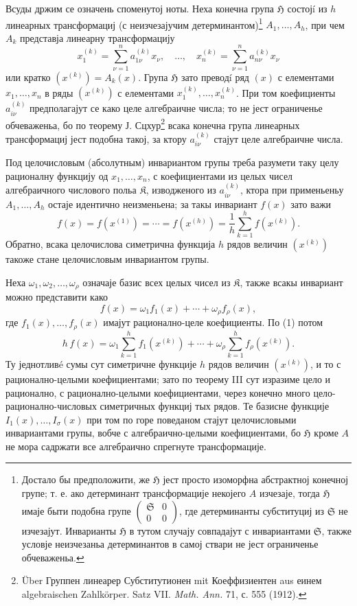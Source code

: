 ﻿\documentclass[11pt]{article}
\providecommand{\frH}{\mathfrak H}
\providecommand{\frK}{\mathfrak K}
\providecommand{\frS}{\mathfrak S}
\begin{document}
Всуды држим се означень споменутој ноты. Неха конечна група \(\frH\) состојí из \(h\) линеарных трансформациј (с неизчезајучим детерминантом)\footnote{Достало бы предположити, же \(\frH\) јест просто изоморфна абстрактној конечној групе; т. е. ако детерминант трансформације некојего \(A\) изчезаје, тогда \(\frH\) имаје быти подобна групе \(\begin{pmatrix}\frS&0\\0&0\end{pmatrix}\), где детерминанты субституциј из \(\frS\) не изчезајут. Инварианты \(\frH\) в тутом случају совпадајут с инвариантами \(\frS\), также условје неизчезаньа детерминантов в самој ствари не јест ограниченье обчеваженьа.} \(A_1,\ldots,A_h\), при чем \(A_k\) представја линеарну трансформацију
\[
        x_1^{(k)}=\sum_{\nu=1}^{n}a_{1\nu}^{(k)}x_\nu,
        \quad\ldots,\quad
        x_n^{(k)}=\sum_{\nu=1}^{n}a_{n\nu}^{(k)}x_\nu
\]
или кратко \((x^{(k)})=A_k(x)\). Група \(\frH\) зато преводí ряд \((x)\) с елементами \(x_1,\ldots,x_n\) в ряды \((x^{(k)})\) с елементами \(x_1^{(k)},\ldots,x_n^{(k)}\). При том коефициенты \(a_{i\nu}^{(k)}\) предполагајут се како целе алгебраичне числа; то не јест ограниченье обчеваженьа, бо по теорему Ј. Сцхур\footnote{Über Группен линеарер Субститутионен mit Коеффизиентен aus еинем algebraischen Zahlkörper. Satz VII. \emph{Math. Ann.} 71, с. 555 (1912).} всака конечна група линеарных трансформациј јест подобна такој, за ктору \(a_{i\nu}^{(k)}\) стајут целе алгебраичне числа.

Под целочисловым (абсолутным) инвариантом групы треба разумети таку целу рационалну функцију од \(x_1,\ldots,x_n\), с коефициентами из целых чисел алгебраичного числового польа \(\frK\), изводженого из \(a_{i\nu}^{(k)}\), ктора при применьеньу \(A_1,\ldots,A_h\) остаје идентично неизменьена; за такы инвариант \(f(x)\) зато важи
\begin{equation}
        f(x)=f(x^{(1)})=\cdots=f(x^{(h)})
        =\frac1h\sum_{k=1}^{h}f(x^{(k)}).
\end{equation}
Обратно, всака целочислова симетрична функција \(h\) рядов величин \((x^{(k)})\) такоже стане целочисловым инвариантом групы.

Неха \(\omega_1,\omega_2,\ldots,\omega_\rho\) означаје базис всех целых чисел из \(\frK\), также всакы инвариант можно представити како
\[
        f(x)=\omega_1 f_1(x)+\cdots+\omega_\rho f_\rho(x),
\]
где \(f_1(x),\ldots,f_\rho(x)\) имајут рационално-целе коефициенты. По (1) потом
\[
        h\,f(x)
        =
        \omega_1\sum_{k=1}^{h}f_1(x^{(k)})
        +\cdots+
        \omega_\rho\sum_{k=1}^{h}f_\rho(x^{(k)}).
\]
Ту једнотливé сумы сут симетричне функције \(h\) рядов величин \((x^{(k)})\), и то с рационално-целыми коефициентами; зато по теорему III сут изразиме цело и рационално, с рационално-целыми коефициентами, через конечно много цело-рационално-числовых симетричных функциј тых рядов. Те базисне функције \(I_1(x),\ldots,I_\sigma(x)\) при том по горе поведаном стајут целочисловыми инвариантами групы, вобче с алгебраично-целыми коефициентами, бо \(\frH\) кроме \(A\) не мора садржати все алгебраично спрегнуте трансформације.
\end{document}

